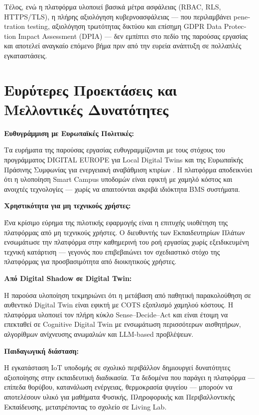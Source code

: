 Τέλος, ενώ η πλατφόρμα υλοποιεί βασικά μέτρα ασφάλειας (\textlatin{RBAC}, \textlatin{RLS}, \textlatin{HTTPS/TLS}), η πλήρης αξιολόγηση κυβερνοασφάλειας --- που περιλαμβάνει \textlatin{penetration testing}, αξιολόγηση τρωτότητας δικτύου και επίσημη \textlatin{GDPR Data Protection Impact Assessment (DPIA)} --- δεν εμπίπτει στο πεδίο της παρούσας εργασίας και αποτελεί αναγκαίο επόμενο βήμα πριν από την ευρεία ανάπτυξη σε πολλαπλές εγκαταστάσεις.

\section{Ευρύτερες Προεκτάσεις και Μελλοντικές Δυνατότητες}
\noindent\textbf{Ευθυγράμμιση με Ευρωπαϊκές Πολιτικές:}

Τα ευρήματα της παρούσας εργασίας ευθυγραμμίζονται με τους στόχους του προγράμματος \textlatin{DIGITAL EUROPE} για \textlatin{Local Digital Twins} και της Ευρωπαϊκής Πράσινης Συμφωνίας για ενεργειακή αναβάθμιση κτιρίων \cite{EuropeanCommission2023, EUParliament2024}. Η πλατφόρμα αποδεικνύει ότι η υλοποίηση \textlatin{Smart Campus} υποδομών είναι εφικτή με χαμηλό κόστος και ανοιχτές τεχνολογίες --- χωρίς να απαιτούνται ακριβά ιδιόκτητα \textlatin{BMS} συστήματα.

\noindent\textbf{Χρηστικότητα για μη τεχνικούς χρήστες:}

Ένα κρίσιμο εύρημα της πιλοτικής εφαρμογής είναι η επιτυχής υιοθέτηση της πλατφόρμας από μη τεχνικούς χρήστες. Ο διευθυντής των Εκπαιδευτηρίων Πλάτων ενσωμάτωσε την πλατφόρμα στην καθημερινή του ροή εργασίας χωρίς εξειδικευμένη τεχνική κατάρτιση --- γεγονός που επιβεβαιώνει τον σχεδιαστικό στόχο της πλατφόρμας για προσβασιμότητα από διοικητικούς χρήστες.

\noindent\textbf{Από \textlatin{Digital Shadow} σε \textlatin{Digital Twin}:}

Η παρούσα υλοποίηση τεκμηριώνει ότι η μετάβαση από παθητική παρακολούθηση σε αυθεντικό \textlatin{Digital Twin} είναι εφικτή με \textlatin{COTS} εξοπλισμό χαμηλού κόστους. Η πλατφόρμα υλοποιεί τον πλήρη κύκλο \textlatin{Sense--Decide--Act} και είναι έτοιμη να επεκταθεί σε \textlatin{Cognitive Digital Twin} με ενσωμάτωση περισσότερων αισθητήρων, αλγορίθμων ανίχνευσης ανωμαλιών και \textlatin{LLM-based} προβλέψεων.

\noindent\textbf{Παιδαγωγική διάσταση:}

Η εγκατάσταση \textlatin{IoT} υποδομής σε σχολικό περιβάλλον δημιουργεί δυνατότητες αξιοποίησης στην εκπαιδευτική διαδικασία. Τα δεδομένα που παράγει η πλατφόρμα --- επίπεδα θορύβου, κατανάλωση ενέργειας, θερμοκρασία ψυγείου --- μπορούν να αποτελέσουν υλικό για μαθήματα Φυσικής, Πληροφορικής και Περιβαλλοντικής Εκπαίδευσης, μετατρέποντας το σχολείο σε \textlatin{Living Lab}.

